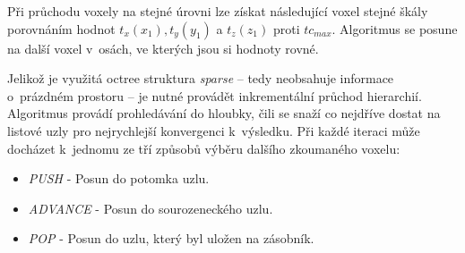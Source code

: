 Při průchodu voxely na stejné úrovni lze získat následující voxel stejné škály porovnáním hodnot $t_x(x_1), t_y(y_1)$ a $t_z(z_1)$ proti $tc_{max}$. Algoritmus se posune na další voxel v~osách, ve kterých jsou si hodnoty rovné.

Jelikož je využitá octree struktura \textit{sparse} -- tedy neobsahuje informace o~prázdném prostoru -- je nutné provádět inkrementální průchod hierarchií. Algoritmus provádí prohledávání do hloubky, čili se snaží co nejdříve dostat na listové uzly pro nejrychlejší konvergenci k~výsledku. Při každé iteraci může docházet k~jednomu ze tří způsobů výběru dalšího zkoumaného voxelu:

\begin{itemize}
    \item \textit{PUSH} - Posun do potomka uzlu.
    \item \textit{ADVANCE} - Posun do sourozeneckého uzlu.
    \item \textit{POP} - Posun do uzlu, který byl uložen na zásobník.
\end{itemize}

